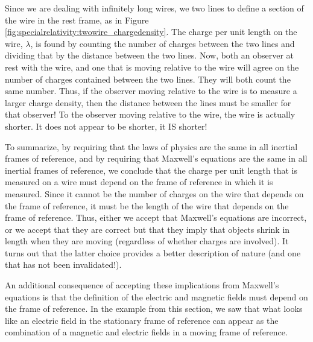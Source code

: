 Since we are dealing with infinitely long wires, we two lines to define a section of the wire in the rest frame, as in Figure \ref{fig:specialrelativity:twowire_chargedensity}. The charge per unit length on the wire, $\lambda$, is found by counting the number of charges between the two lines and dividing that by the distance between the two lines. Now, both an observer at rest with the wire, and one that is moving relative to the wire will agree on the number of charges contained between the two lines. They will both count the same number. Thus, if the observer moving relative to the wire is to measure a larger charge density, then the distance between the lines must be smaller for that observer! To the observer moving relative to the wire, the wire is actually shorter. It does not appear to be shorter, it IS shorter!

To summarize, by requiring that the laws of physics are the same in all inertial frames of reference, and by requiring that Maxwell's equations are the same in all inertial frames of reference, we conclude that the charge per unit length that is measured on a wire must depend on the frame of reference in which it is measured. Since it cannot be the number of charges on the wire that depends on the frame of reference, it must be the length of the wire that depends on the frame of reference. Thus, either we accept that Maxwell's equations are incorrect, or we accept that they are correct but that they imply that objects shrink in length when they are moving (regardless of whether charges are involved). It turns out that the latter choice provides a better description of nature (and one that has not been invalidated!). 

An additional consequence of accepting these implications from Maxwell's equations is that the definition of the electric and magnetic fields must depend on the frame of reference. In the example from this section, we saw that what looks like an electric field in the stationary frame of reference can appear as the combination of a magnetic and electric fields in a moving frame of reference.

